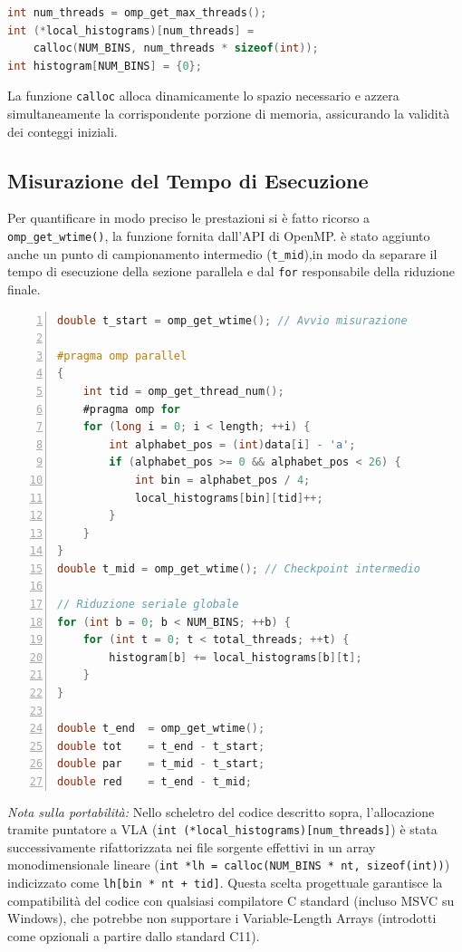 \documentclass[a4paper,11pt]{article}
\begin{document}
\begin{lstlisting}[language=C, numbers=none, frame=single, basicstyle=\ttfamily\small]
int num_threads = omp_get_max_threads();
int (*local_histograms)[num_threads] = 
    calloc(NUM_BINS, num_threads * sizeof(int));
int histogram[NUM_BINS] = {0};
\end{lstlisting}

La funzione \texttt{calloc} alloca dinamicamente lo spazio  necessario e azzera simultaneamente la corrispondente porzione di memoria, assicurando la validità dei conteggi iniziali.

\subsection{Misurazione del Tempo di Esecuzione}

Per quantificare in modo preciso le prestazioni si è fatto ricorso a \texttt{omp\_get\_wtime()}, la funzione fornita dall'API di OpenMP. è stato aggiunto anche un punto di campionamento intermedio (\texttt{t\_mid}),in modo da separare il tempo di esecuzione della sezione parallela e dal \texttt{for} responsabile della riduzione finale.

\begin{lstlisting}[language=C, numbers=left, frame=single, basicstyle=\ttfamily\small]
double t_start = omp_get_wtime(); // Avvio misurazione

#pragma omp parallel
{
    int tid = omp_get_thread_num();
    #pragma omp for
    for (long i = 0; i < length; ++i) {
        int alphabet_pos = (int)data[i] - 'a';
        if (alphabet_pos >= 0 && alphabet_pos < 26) {
            int bin = alphabet_pos / 4;
            local_histograms[bin][tid]++;
        }
    }
}
double t_mid = omp_get_wtime(); // Checkpoint intermedio

// Riduzione seriale globale
for (int b = 0; b < NUM_BINS; ++b) {
    for (int t = 0; t < total_threads; ++t) {
        histogram[b] += local_histograms[b][t];
    }
}

double t_end  = omp_get_wtime();
double tot    = t_end - t_start;
double par    = t_mid - t_start;
double red    = t_end - t_mid;
\end{lstlisting}

\textit{Nota sulla portabilità:} Nello scheletro del codice descritto sopra, l'allocazione tramite puntatore a VLA (\texttt{int (*local\_histograms)[num\_threads]}) è stata successivamente rifattorizzata nei file sorgente effettivi in un array monodimensionale lineare (\texttt{int *lh = calloc(NUM\_BINS * nt, sizeof(int))}) indicizzato come \texttt{lh[bin * nt + tid]}. Questa scelta progettuale garantisce la compatibilità del codice con qualsiasi compilatore C standard (incluso MSVC su Windows), che potrebbe non supportare i Variable-Length Arrays (introdotti come opzionali a partire dallo standard C11).
\end{document}
